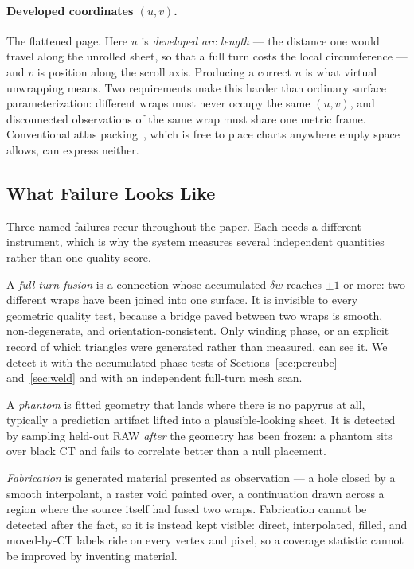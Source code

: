 \paragraph{Developed coordinates $(u,v)$.} The flattened page. Here $u$ is \emph{developed arc length} --- the distance one would travel along the unrolled sheet, so that a full turn costs the local circumference --- and $v$ is position along the scroll axis. Producing a correct $u$ is what virtual unwrapping means. Two requirements make this harder than ordinary surface parameterization: different wraps must never occupy the same $(u,v)$, and disconnected observations of the same wrap must share one metric frame. Conventional atlas packing~\cite{limper2018box}, which is free to place charts anywhere empty space allows, can express neither.

\subsection{What Failure Looks Like}
\label{sec:failures}

Three named failures recur throughout the paper. Each needs a different instrument, which is why the system measures several independent quantities rather than one quality score.

A \emph{full-turn fusion} is a connection whose accumulated $\delta w$ reaches $\pm 1$ or more: two different wraps have been joined into one surface. It is invisible to every geometric quality test, because a bridge paved between two wraps is smooth, non-degenerate, and orientation-consistent. Only winding phase, or an explicit record of which triangles were generated rather than measured, can see it. We detect it with the accumulated-phase tests of Sections~\ref{sec:percube} and~\ref{sec:weld} and with an independent full-turn mesh scan.

A \emph{phantom} is fitted geometry that lands where there is no papyrus at all, typically a prediction artifact lifted into a plausible-looking sheet. It is detected by sampling held-out RAW \emph{after} the geometry has been frozen: a phantom sits over black CT and fails to correlate better than a null placement.

\emph{Fabrication} is generated material presented as observation --- a hole closed by a smooth interpolant, a raster void painted over, a continuation drawn across a region where the source itself had fused two wraps. Fabrication cannot be detected after the fact, so it is instead kept visible: direct, interpolated, filled, and moved-by-CT labels ride on every vertex and pixel, so a coverage statistic cannot be improved by inventing material.


